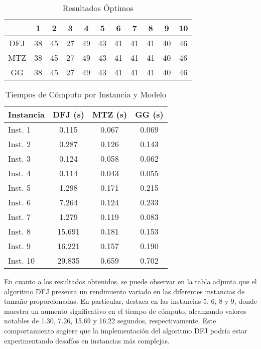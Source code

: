 \documentclass[
	spanish, %
	oneside
]{article}
\begin{document}
\begin{table}[h]
	\centering
	\caption{Resultados Óptimos}
	\label{tab:results}
	\begin{tabular}{@{}ccccccccccc@{}}
	\toprule
		& 1  & 2  & 3  & 4  & 5  & 6  & 7  & 8  & 9  & 10 \\
	\midrule
	DFJ & 38 & 45 & 27 & 49 & 43 & 41 & 41 & 41 & 40 & 46 \\
	MTZ & 38 & 45 & 27 & 49 & 43 & 41 & 41 & 41 & 40 & 46 \\
	GG  & 38 & 45 & 27 & 49 & 43 & 41 & 41 & 41 & 40 & 46 \\
	\bottomrule
	\end{tabular}
	\end{table}

\begin{table}[h]
	\centering
	\caption{Tiempos de Cómputo por Instancia y Modelo}
	\label{tab:computation_times}
	\begin{tabular}{@{}lccc@{}}
	\toprule
	Instancia & DFJ (s) & MTZ (s) & GG (s) \\
	\midrule
	Inst. 1  & 0.115 & 0.067 & 0.069 \\
	Inst. 2  & 0.287 & 0.126 & 0.143 \\
	Inst. 3  & 0.124 & 0.058 & 0.062 \\
	Inst. 4  & 0.114 & 0.043 & 0.055 \\
	Inst. 5  & 1.298 & 0.171 & 0.215 \\
	Inst. 6  & 7.264 & 0.124 & 0.233 \\
	Inst. 7  & 1.279 & 0.119 & 0.083 \\
	Inst. 8  & 15.691 & 0.181 & 0.153 \\
	Inst. 9  & 16.221 & 0.157 & 0.190 \\
	Inst. 10 & 29.835 & 0.659 & 0.702 \\
	\bottomrule
	\end{tabular}
	\end{table}

En cuanto a los resultados obtenidos, se puede observar en la tabla adjunta que el algoritmo DFJ presenta un rendimiento variado en las diferentes instancias de tamaño proporcionadas. En particular, destaca en las instancias 5, 6, 8 y 9, donde muestra un aumento significativo en el tiempo de cómputo, alcanzando valores notables de 1.30, 7.26, 15.69 y 16.22 segundos, respectivamente. Este comportamiento sugiere que la implementación del algoritmo DFJ podría estar experimentando desafíos en instancias más complejas.
\end{document}
